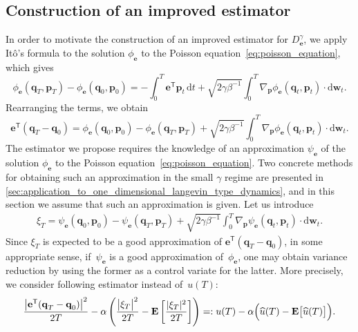 \documentclass[11pt,a4paper]{article}
\newcommand{\expect}[0]{\mathbf{E}}
\newcommand{\grad}{\nabla}
\newcommand{\vect}[1]{\boldsymbol{\mathbf #1}}
\renewcommand{\d}{\mathrm d}
\renewcommand{\t}{\mathsf T}
\theoremstyle{plain}
\numberwithin{equation}{section}
\begin{document}
\subsection{Construction of an improved estimator}%
\label{sub:construction_of_an_improved_estimator}
In order to motivate the construction of an improved estimator for $D^{\gamma}_{\vect e}$,
we apply It\^o's formula to the solution $\phi_{\vect e}$ to the Poisson equation~\eqref{eq:poisson_equation},
which gives
\[
    \phi_{\vect e}(\vect q_T, \vect p_T) - \phi_{\vect e}(\vect q_0, \vect p_0)
    = - \int_{0}^{T} \vect e^\t \vect p_t \, \d t + \sqrt{2 \gamma \beta^{-1}} \int_{0}^{T} \grad_{\vect p} \phi_{\vect e}(\vect q_t, \vect p_t) \cdot \d \vect w_t.
\]
Rearranging the terms,
we obtain
\begin{equation}
    \label{eq:ito_for_phi}
    \vect e^\t(\vect q_T - \vect q_0) =
    \phi_{\vect e}(\vect q_0, \vect p_0) - \phi_{\vect e}(\vect q_T, \vect p_T)
    + \sqrt{2 \gamma \beta^{-1}} \int_{0}^{T} \grad_{\vect p} \phi_{\vect e}(\vect q_t, \vect p_t) \cdot \d \vect w_t.
\end{equation}
The estimator we propose requires the knowledge of an approximation $\psi_{\vect e}$ of the solution $\phi_{\vect e}$ to the Poisson equation~\eqref{eq:poisson_equation}.
Two concrete methods for obtaining such an approximation in the small $\gamma$ regime are presented in \cref{sec:application_to_one_dimensional_langevin_type_dynamics},
and in this section we assume that such an approximation is given.
Let us introduce
\begin{align}
    \label{eq:definition_control_variate}
    \xi_T = \psi_{\vect e}(\vect q_0, \vect p_0) - \psi_{\vect e}(\vect q_T, \vect p_T)
    + \sqrt{2 \gamma \beta^{-1}} \int_{0}^{T} \grad_{\vect p} \psi_{\vect e}(\vect q_t, \vect p_t) \cdot \d \vect w_t.
\end{align}
Since $\xi_T$ is expected to be a good approximation of $\vect e^\t(\vect q_T - \vect q_0)$,
in some appropriate sense,
if~$\psi_{\vect e}$ is a good approximation of~$\phi_{\vect e}$,
one may obtain variance reduction by using the former as a control variate for the latter.
More precisely, we consider following estimator instead of~$u(T)$:
\begin{equation}
    \label{eq:simple_estimator_improvement_1}
     \frac{\bigl\lvert \vect e^\t (\vect q_T - \vect q_0) \bigr\rvert^2}{2T}  -	\alpha  \left( \frac{\bigl\lvert \xi_T \bigr\rvert^2}{2T} - \expect \left[ \frac{\lvert \xi_T \rvert^2}{2T} \right] \right)
    =: u(T) - \alpha \Bigl(\widehat u(T) - \expect \bigl[\widehat u(T)\bigr]\Bigr).
\end{equation}
\end{document}
